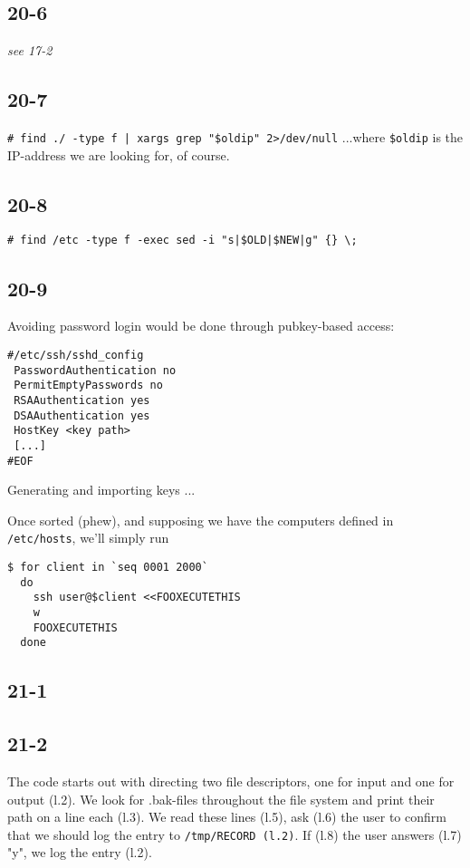 \subsection{20-6}
\emph{see 17-2}

\subsection{20-7}
\verb=# find ./ -type f | xargs grep "$oldip" 2>/dev/null=
...where \verb=$oldip= is the IP-address we are looking for, of course.

\subsection{20-8}
\verb=# find /etc -type f -exec sed -i "s|$OLD|$NEW|g" {} \;=

\subsection{20-9}
Avoiding password login would be done through pubkey-based access:

\begin{verbatim}
#/etc/ssh/sshd_config
 PasswordAuthentication no
 PermitEmptyPasswords no
 RSAAuthentication yes
 DSAAuthentication yes
 HostKey <key path>
 [...]
#EOF
\end{verbatim}

Generating and importing keys ...

Once sorted (phew), and supposing we have the computers defined in \verb=/etc/hosts=,  we'll simply run

\begin{verbatim}
$ for client in `seq 0001 2000`
  do
    ssh user@$client <<FOOXECUTETHIS
    w
    FOOXECUTETHIS
  done
\end{verbatim}
\subsection{21-1}

\subsection{21-2}
The code starts out with directing two file descriptors, one for input and one for output (l.2). We look for .bak-files throughout the file system and print their path on a line each (l.3). We read these lines (l.5), ask (l.6) the user to confirm that we should log the entry to \verb=/tmp/RECORD (l.2)=. If (l.8) the user answers (l.7) "y", we log the entry (l.2).

